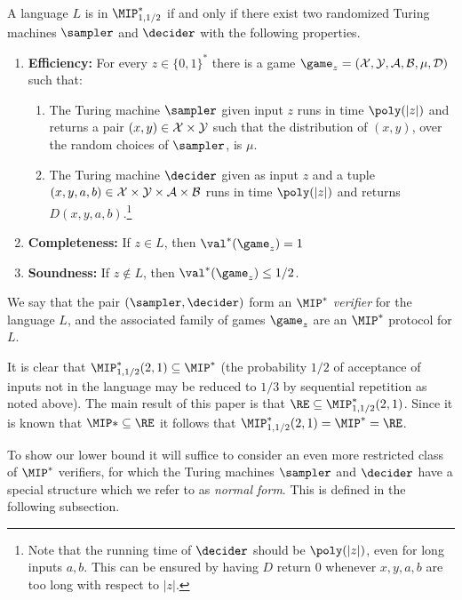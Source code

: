 \begin{definition}\label{def:mipstar}
  A language $L$ is in $\MIP^*_{1,1/2}$ if and only if there exist two randomized Turing machines
  $\sampler$ and $\decider$ with the following properties.
  \begin{enumerate}
    \item \textbf{Efficiency:} For every $z\in\{0,1\}^*$ there is
      a game $\game_z = (\cal{X}, \cal{Y}, \cal{A}, \cal{B}, \mu, D)$
      such that:
      \begin{enumerate}
      \item The Turing machine $\sampler$ given input $z$ runs in time $\poly(|z|)$ and returns a
      pair $(x,y) \in \cal{X} \times \cal{Y}$ such that the distribution of $(x,y)$, over the random choices of $\sampler$, is $\mu$.
    \item The Turing machine $\decider$ given as input $z$ and a tuple $(x,y,a,b)
      \in \cal{X} \times \cal{Y} \times \cal{A} \times \cal{B}$ runs in time $\poly(|z|)$ and returns $D(x,y,a,b)$.\footnote{Note that the running time of $\decider$ should be $\poly(|z|)$, even for long inputs $a,b$. This can be ensured by having $D$ return $0$ whenever $x,y,a,b$ are too long with respect to $|z|$.}
    \end{enumerate}
  \item \textbf{Completeness:} If $z \in L$, then $\val^*(\game_z) = 1$
  \item \textbf{Soundness:} If $z \not\in L$, then $\val^*(\game_z) \leq 1/2$.
  \end{enumerate}
  We say that the pair $(\sampler, \decider)$ form an $\MIP^*$
  \emph{verifier} for the language $L$, and the associated family of
  games $\game_z$ are an $\MIP^*$ protocol for $L$.
\end{definition}

  It is clear that $\MIP^*_{1,1/2}(2,1) \subseteq \MIP^*$ (the
  probability $1/2$ of acceptance of inputs not in the language may be
  reduced to $1/3$ by sequential repetition as noted above). The main result of this paper is that $\RE
  \subseteq \MIP^*_{1,1/2}(2,1)$. Since it is known that $\MIP*\subseteq \RE$ it follows
  that $\MIP^*_{1,1/2}(2,1) = \MIP^* = \RE$. 

 To show our lower bound it will suffice to consider an even more restricted class of $\MIP^*$
  verifiers, for which the Turing machines $\sampler$ and
  $\decider$ have a special structure which we refer to as
  \emph{normal form}. This is defined in the following subsection.
	
